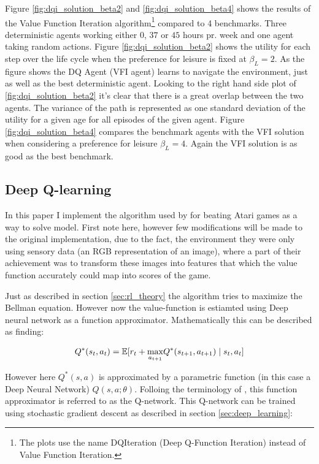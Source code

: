 Figure \ref{fig:dqi_solution_beta2} and \ref{fig:dqi_solution_beta4} shows the results of the Value Function Iteration algorithm\footnote{The plots use the name DQIteration (Deep Q-Function Iteration) instead of Value Function Iteration.} compared to 4 benchmarks. Three deterministic agents working either $0$, $37$ or $45$ hours pr. week and one agent taking random actions. Figure \ref{fig:dqi_solution_beta2} shows the utility for each step over the life cycle when the preference for leisure is fixed at $\beta_L = 2$. As the figure shows the DQ Agent (VFI agent) learns to navigate the environment, just as well as the best deterministic agent. Looking to the right hand side plot of \ref{fig:dqi_solution_beta2} it's clear that there is a great overlap between the two agents. The variance of the path is represented as one standard deviation of the utility for a given age for all episodes of the given agent. Figure \ref{fig:dqi_solution_beta4} compares the benchmark agents with the VFI solution when considering a preference for leisure $\beta_L = 4$. Again the VFI solution is as good as the best benchmark.

\newpage

\subsection{Deep Q-learning}

In this paper I implement the algorithm used by \textcite{mnih_playing_2013} for beating Atari games as a way to solve model. First note here, however few modifications will be made to the original implementation, due to the fact, the environment they were only using sensory data (an RGB representation of an image), where a part of their achievement was to transform these images into features that which the value function accurately could map into scores of the game. 

Just as described in section \ref{sec:rl_theory} the algorithm tries to maximize the Bellman equation. However now the value-function is estiamted using Deep neural network as a function approximator. Mathematically this can be described as finding:

\begin{equation}
    Q^*(s_t,a_t) = \mathbb{E} [r_t + \underset{a_{t+1}}{\max}  Q^*(s_{t+1}, a_{t+1}) \mid s_t, a_t]
\end{equation}

However here $Q^*(s, a)$ is approximated by a parametric function (in this case a Deep Neural Network) $Q(s, a ; \theta)$. Folloing the terminology of \textcite{mnih_playing_2013}, this function approximator is referred to as the Q-network. This Q-network can be trained using stochastic gradient descent as described in section \ref{sec:deep_learning}:

